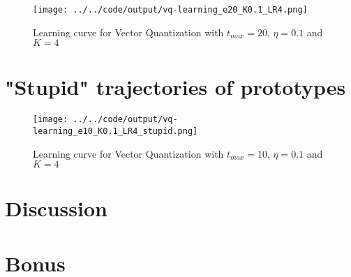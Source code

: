 \documentclass[twoside, a4paper, fleqn, reqno]{article}
\begin{document}
\begin{figure}[H]
	\centering
	\texttt{[image: ../../code/output/vq-learning\_e20\_K0.1\_LR4.png]}
	\caption{Learning curve for Vector Quantization with $t_{max}=20$, $\eta=0.1$ and $K=4$}
	\label{fig:vq-learning_e20_K0.1_LR4}
\end{figure}

\section{"Stupid" trajectories of prototypes}

\begin{figure}[H]
	\centering
	\texttt{[image: ../../code/output/vq-learning\_e10\_K0.1\_LR4\_stupid.png]}
	\caption{Learning curve for Vector Quantization with $t_{max}=10$, $\eta=0.1$ and $K=4$}
	\label{fig:vq-learning_e20_K0.1_LR4_stupid}
\end{figure}

\section{Discussion}

\section{Bonus}
\end{document}
